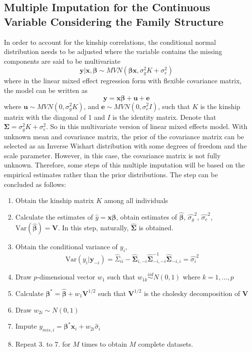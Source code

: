 \documentclass[preprint,12pt]{elsarticle}
\begin{document}
\subsection{Multiple Imputation for the Continuous Variable Considering the Family Structure}
In order to account for the kinship correlations, the conditional normal distribution needs to be adjusted where the variable contains the missing components are said to be multivariate 
\begin{equation} 
    \mathbf{y}|\mathbf{x},\boldsymbol{\beta}\sim MVN(\boldsymbol{\beta}\mathbf{x}, \sigma_g^2K+\sigma_e^2)
\end{equation}
where in the linear mixed effect regression form with flexible covariance matrix, the model can be written as 
\begin{equation} 
    \mathbf{y}=\mathbf{x}\boldsymbol{\beta}+\mathbf{u}+\mathbf{e}
\end{equation}
where $\mathbf{u}\sim MVN(0,\sigma_g^2K)$, and $\mathbf{e}\sim MVN(0,\sigma_e^2I)$, such that $K$ is the kinship matrix with the diagonal of 1 and $I$ is the identity matrix. 
Denote that $\boldsymbol{\Sigma}=\sigma_g^2K+\sigma_e^2$. 
So in this multivariate version of linear mixed effects model. 
With unknown mean and covariance matrix, the prior of the covariance matrix can be selected as an Inverse Wishart distribution with some degrees of freedom and the scale parameter. 
However, in this case, the covariance matrix is not fully unknown. 
Therefore, some steps of this multiple imputation will be based on the empirical estimates rather than the prior distributions. 
The step can be concluded as follows: 
\begin{enumerate} 
    \item Obtain the kinship matrix $K$ among all individuals 
    \item Calculate the estimates of $\hat{y}=\mathbf{x}\boldsymbol{\beta}$, obtain estimates of $\hat{\boldsymbol{\beta}}$, $\hat{\sigma_g}^2$, $\hat{\sigma_e}^2$, $\text{Var}(\hat{\boldsymbol{\beta}})=\mathbf{V}$. In this step, naturally, $\boldsymbol{\hat{\Sigma}}$ is obtained.
    \item Obtain the conditional variance of $y_i$, 
    \begin{equation} 
        \text{Var}(y_i|\mathbf{y}_{-i})=\hat{\Sigma}_{ii}-\hat{\boldsymbol{\Sigma}}_{i,-i}\hat{\boldsymbol{\Sigma}}_{-i,-i}^{-1}\hat{\boldsymbol{\Sigma}}_{-i,i}=\hat{\sigma_i}^2
    \end{equation}
    \item Draw $p$-dimensional vector $w_1$ such that $w_{1k}\stackrel{iid}{\sim} N(0,1)$ where $k=1,...,p$
    \item Calculate $\boldsymbol{\beta}^*=\hat{\boldsymbol{\beta}}+w_1\mathbf{V}^{1/2}$ such that $\mathbf{V}^{1/2}$ is the cholesky decomposition of $\mathbf{V}$
    \item Draw $w_{2i}\sim N(0,1)$
    \item Impute $y_{mis,i}=\boldsymbol{\beta}^*\mathbf{x}_i + w_{2i}\hat{\sigma}_i$
    \item Repeat 3. to 7. for $M$ times to obtain $M$ complete datasets.
\end{enumerate}
\end{document}
